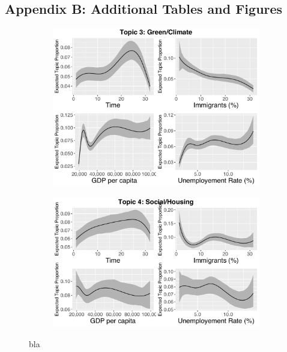 \subsection*{Appendix B: Additional Tables and Figures}

\begin{figure}[h!]
  \centering
  \begin{subfigure}[b]{0.4\linewidth}
    \includegraphics[width=\linewidth]{../plots/appendix/4_4/beta_t3_cont.pdf}
  \end{subfigure}
  \begin{subfigure}[b]{0.4\linewidth}
    \includegraphics[width=\linewidth]{../plots/appendix/4_4/beta_t4_cont.pdf}
  \end{subfigure}
  \caption{bla}
  \label{fig:coffee}
\end{figure}

